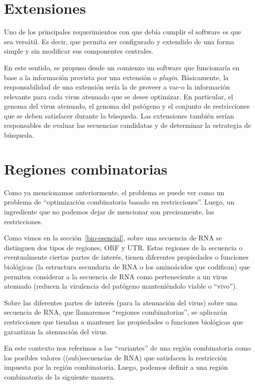 \section{Extensiones}

Uno de los principales requerimientos con que deb\'ia cumplir el software es
que sea vers\'atil. Es decir, que permita ser configurado y extendido de una
forma simple y sin modificar sus componentes centrales.

En este sentido, se propuso desde un comienzo un software que funcionar\'ia en
base a la informaci\'on provista por una extensi\'on o \textit{plugin}.
B\'asicamente, la responsabilidad de una extensi\'on ser\'ia la de proveer a
\ac{vac-o} la informaci\'on relevante para cada virus atenuado que se desee
optimizar. En particular, el genoma del virus atenuado, el genoma del
pat\'ogeno y el conjunto de restricciones que se deben satisfacer durante la
b\'usqueda. Las extensiones tambi\'en ser\'ian responsables de evaluar las
secuencias candidatas y de determinar la estrategia de b\'usqueda.


\section{Regiones combinatorias}

Como ya mencionamos anteriormente, el problema se puede ver como un problema de
``optimizaci\'on combinatoria basado en restricciones''. Luego, un ingrediente
que no podemos dejar de mencionar son precisamente, las restricciones. 

Como vimos en la secci\'on~\ref{bio-esencial}, sobre una secuencia de \ac{RNA}
se distinguen dos tipos de regiones, \ac{ORF} y \ac{UTR}. Estas regiones de la
secuencia o eventualmente ciertas partes de inter\'es, tienen diferentes
propiedades o funciones biol\'ogicas (la estructura secundaria de \ac{RNA} o
los amino\'acidos que codifican) que permiten considerar a la secuencia de
\ac{RNA} como perteneciente a un virus atenuado (reducen la virulencia del
pat\'ogeno manteni\'endolo viable o ``vivo'').

Sobre las diferentes partes de inter\'es (para la atenuaci\'on del virus)
sobre una secuencia de \ac{RNA}, que llamaremos ``regiones combinatorias'', se
aplicar\'an restricciones que tiendan a mantener las propiedades o funciones
biol\'ogicas que garantizan la atenuaci\'on del virus. 

En este contexto nos referimos a las ``variantes'' de una regi\'on combinatoria
como los posibles valores ((sub)secuencias de \ac{RNA}) que satisfacen la
restricci\'on impuesta por la regi\'on combinatoria. Luego, podemos definir a
una regi\'on combinatoria de la siguiente manera.

